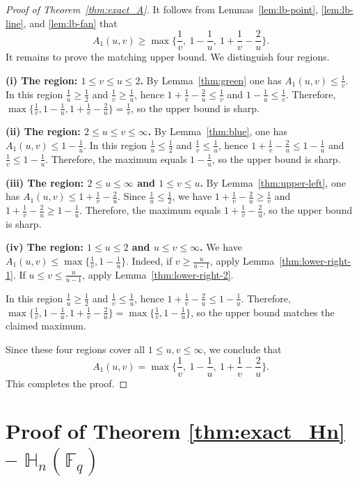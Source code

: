 \documentclass[11pt]{article}
\newcommand{\1}{\mathbf 1}
\begin{document}
\begin{proof}[Proof of Theorem~\ref{thm:exact_A}]
It follows from Lemmas~\ref{lem:lb-point}, \ref{lem:lb-line}, and \ref{lem:lb-fan} that
\[
A_1(u, v)\ge \max\Bigg\{\frac1v,\ 1-\frac1u,\ 1+\frac1v-\frac{2}{u}\Bigg\}.
\]
It remains to prove the matching upper bound. We distinguish four regions.

\medskip
\noindent\textbf{(i) The region: $1\le v\le u\le 2$.}
By Lemma~\ref{thm:green} one has $A_1(u, v)\le \frac{1}{v}$.
In this region $\frac1u\ge \frac12$ and $\frac1v\ge \frac1u$, hence $1+\frac1v-\frac{2}{u}\le \frac1v$ and $1-\frac1u\le \frac1v$.
Therefore, $\max \big\{\frac1v,1-\frac1u,1+\frac1v-\frac{2}{u} \big\}=\frac1v$, so the upper bound is sharp.

\medskip
\noindent\textbf{(ii) The region: $2\le u\le v\le \infty$.}
By Lemma~\ref{thm:blue}, one has $A_1(u, v)\le 1-\frac1u$.
In this region $\frac1u\le \frac12$ and $\frac1v\le \frac1u$, hence $1+\frac1v-\frac{2}{u}\le 1-\frac1u$ and $\frac1v\le 1-\frac1u$.
Therefore, the maximum equals $1-\frac1u$, so the upper bound is sharp.

\medskip
\noindent\textbf{(iii) The region: $2\le u\le\infty$ and $1\le v\le u$.}
By Lemma~\ref{thm:upper-left}, one has $A_1(u, v)\le 1+\frac1v-\frac{2}{u}$.
Since $\frac1u\le \frac12$, we have $1+\frac1v-\frac{2}{u}\ge \frac1v$ and $1+\frac1v-\frac{2}{u}\ge 1-\frac1u$.
Therefore, the maximum equals $1+\frac1v-\frac{2}{u}$, so the upper bound is sharp.

\medskip
\noindent\textbf{(iv) The region: $1\le u\le 2$ and $u\le v\le \infty$.} We have $A_1(u, v)\le \max \big\{\frac1v,1-\frac1u \big\}$. Indeed, if $v\ge \frac{u}{u-1}$, apply Lemma~\ref{thm:lower-right-1}. If $u\le v\le \frac{u}{u-1}$, apply Lemma~\ref{thm:lower-right-2}.

In this region $\frac1u\ge \frac12$ and $\frac1v\le \frac1u$, hence $1+\frac1v-\frac{2}{u}\le 1-\frac1u$.
Therefore, $\max\big\{\frac1v,1-\frac1u,1+\frac1v-\frac{2}{u}\big\}=\max\big\{\frac1v,1-\frac1u \big\}$, so the upper bound matches the claimed maximum.

\medskip
Since these four regions cover all $1\le u,v\le\infty$, we conclude that
\[
A_1(u, v)= \max\Bigg\{\frac1v,\ 1-\frac1u,\ 1+\frac1v-\frac{2}{u}\Bigg\}.
\]
This completes the proof.
\end{proof}




\section{Proof of Theorem \ref{thm:exact_Hn} -- $\mathbb{H}_n(\mathbb{F}_q)$}\label{section7}
\end{document}
